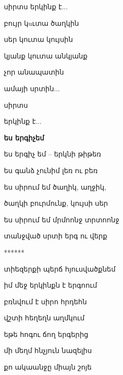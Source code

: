                                    սիրտս երկինք է...

                                   բույր կuւտա ծաղկին

                                   սեր կուտա կույսին

                                   կյանք կուտա  անկյանք


                                   չոր անապատին


                                   ամայի սրտին...

                                   սիրտս
                                 

                                 երկինք    է...






                                 \centerline{\bf ես երգիչեմ}


                                 ես երգիչ եմ -- երկնի թիթեռ

                                 ես գանձ չունիմ լեռ ու բեռ


                                  ես  սիրում եմ ծաղիկ, աղջիկ, 


                                  ծաղկի բուրմունք, կույսի սեր


                                  ես սիրում եմ մրմոոնջ տրտոոնջ


                                  տանջված    սրտի երգ ու վերք 


                                          \centerline {******}
                                            


                                   տիեզերքի պերճ հյուսվածքնեմ 



                                   իմ մեջ երկինքն է երգոում



                                     բռնվում  է սիրո հրդեհն


                                     վշտի հեղեղն աղմկում








                                      եթե հոգու ճող երգերից   


                                      մի մեղմ հնչյուն  նազելիս


                                      քո ակաանջը միայն շոյե


